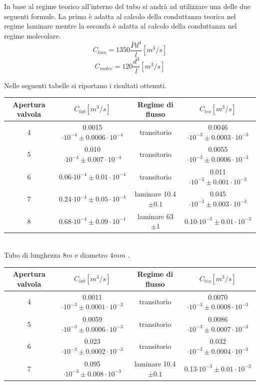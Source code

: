 \documentclass[a4paper,11pt]{article}
\begin{document}
In base al regime teorico all'interno del tubo si andrà ad utilizzare una delle due seguenti formule. La prima è adatta al calcolo della conduttanza teorica nel regime laminare mentre la seconda è adatta al calcolo della conduttanza nel regime molecolare.
$$C_{lam}=1350\frac{\bar{P}d^4}{l}[m^3/s]$$
$$C_{molec}=120\frac{d^3}{l}[m^3/s]$$
 
Nelle seguenti tabelle si riportano i risultati ottenuti.\\
 

\begin{center} 
\begin{tabular}{|c|c|c|c|}
\hline Apertura valvola & $C_{lab} [m^3/s]$ & Regime di flusso & $C_{teo} [m^3/s]$ \\ 
\hline 4 & 0.0015 $\cdot10^{-4}\pm 0.0006\cdot10^{-4}$ & transitorio & 0.0046$\cdot10^{-3}\pm 0.0003\cdot10^{-3}$ \\ 
\hline 5 & 0.010$\cdot10^{-4}\pm 0.007\cdot10^{-4}$ & transitorio & 0.0055$\cdot10^{-3}\pm 0.0006\cdot10^{-3}$ \\ 
\hline 6 & 0.06$\cdot10^{-4}\pm 0.01\cdot10^{-4}$ & transitorio & 0.011$\cdot10^{-3}\pm 0.001\cdot10^{-3}$ \\
\hline 7 & 0.24$\cdot10^{-4}\pm 0.05\cdot10^{-4}$ & laminare 10.4$\pm0.1$ & 0.045$\cdot10^{-3}\pm 0.003\cdot10^{-3}$ \\
\hline 8 & 0.68$\cdot10^{-4}\pm 0.09\cdot10^{-4}$ & laminare 63$\pm1$ & 0.10$\cdot10^{-3}\pm 0.01\cdot10^{-3}$ \\ 
\hline 
\end{tabular}\\
\vspace{5pt}
Tubo di lunghezza $8m$ e diametro $4mm$ .
\\
\vspace{15pt}
\begin{tabular}{|c|c|c|c|}
\hline Apertura valvola & $C_{lab} [m^3/s]$ & Regime di flusso & $C_{teo} [m^3/s]$ \\ 
\hline 4 & 0.0011$\cdot10^{-3}\pm 0.0001\cdot10^{-3}$ & transitorio & 0.0070$\cdot10^{-3}\pm 0.0008\cdot10^{-3}$ \\ 
\hline 5 & 0.0059$\cdot10^{-3}\pm 0.0006\cdot10^{-3}$ & transitorio & 0.0086$\cdot10^{-3}\pm 0.0007\cdot10^{-3}$ \\ 
\hline 6 & 0.023$\cdot10^{-3}\pm 0.0002\cdot10^{-3}$ & transitorio & 0.032$\cdot10^{-3}\pm 0.0004\cdot10^{-3}$ \\
\hline 7 & 0.095$\cdot10^{-3}\pm 0.008\cdot10^{-3}$ & laminare 10.4$\pm0.1$ & 0.13$\cdot10^{-3}\pm 0.01\cdot10^{-3}$ \\

\end{tabular}
\end{center}
\end{document}
